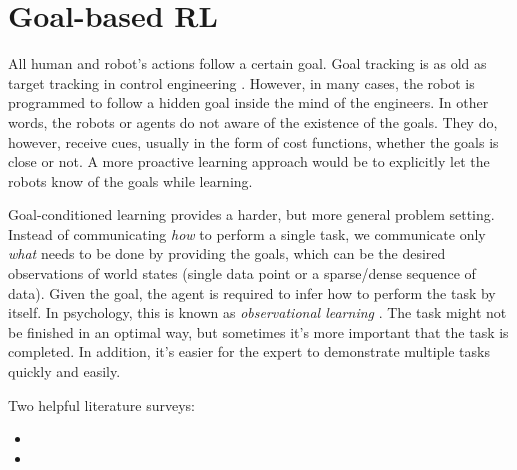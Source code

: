 \chapter{Goal-based RL}
All human and robot's actions follow a certain goal. Goal tracking is as old as target tracking in control engineering \cite{mcdermott1992robot}. However, in many cases, the robot is programmed to follow a hidden goal inside the mind of the engineers. In other words, the robots or agents do not aware of the existence of the goals. They do, however, receive cues, usually in the form of cost functions, whether the goals is close or not. A more proactive learning approach would be to explicitly let the robots know of the goals while learning.

Goal-conditioned learning provides a harder, but more general problem setting. Instead of communicating \textit{how} to perform a single task, we communicate only \textit{what} needs to be done by providing the goals, which can be the desired observations of world states (single data point or a sparse/dense sequence of data). Given the goal, the agent is required to infer how to perform the task by itself. In psychology, this is known as \textit{observational learning} \cite{bandura1977social}. The task might not be finished in an optimal way, but sometimes it's more important that the task is completed. In addition, it's easier for the expert to demonstrate multiple tasks quickly and easily. \cite{pathak2018zero}

Two helpful literature surveys:
\begin{itemize}
	\item {}
	\item {}
\end{itemize}

